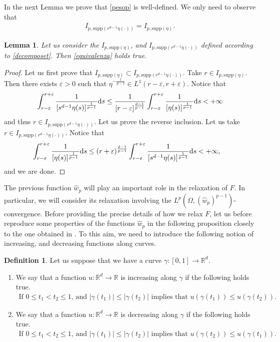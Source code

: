 \documentclass[11pt,leqno]{amsart}
\newtheorem{lem}[teo]{Lemma}
\theoremstyle{remark}
\theoremstyle{definition}
\newtheorem{defi}[teo]{Definition}%
\theoremstyle{definition}
\newcommand{\wstar}{{\hat w}}
\newcommand{\supp}{\mathrm{supp}}
\newcommand{\bbR}{{\mathbb{R}}}
\newcommand{\R}{\bbR}
\def\de{{\rm d}}
\begin{document}
In the next Lemma we prove that \eqref{pesop} is well-defined. We only need to observe that
\begin{align}
\label{equivalenza}
I_{p,\supp(r^{d-1}\eta(\cdot))}=I_{p,\supp(\eta)}.
\end{align}
\begin{lem}
Let us consider the $I_{p,\supp(\eta)}$, and $I_{p,\supp(r^{d-1}\eta(\cdot))}$ defined according to \eqref{decomposet}. Then \eqref{equivalenza} holds true.
\end{lem}
\begin{proof}
Let us first prove that $I_{p,\supp(\eta)}\subset I_{p,\supp(r^{d-1}\eta(\cdot))}$. Take $r\in I_{p,\supp(\eta)}$. Then there exists $\varepsilon>0$ such that $\eta^{-\frac{1}{p-1}}\in L^{1}(r-\varepsilon,r+\varepsilon)$. Notice that
\begin{align*}
\displaystyle\int_{r-\varepsilon}^{r+\varepsilon}\frac{1}{[s^{d-1}\eta(s)]^{\frac{1}{p-1}}}\de s\leq \frac{1}{[r-\varepsilon]^{\frac{d-1}{p-1}}}\displaystyle\int_{r-\varepsilon}^{r+\varepsilon}\frac{1}{[\eta(s)]^{\frac{1}{p-1}}}\de s<+\infty
\end{align*}
and thus $r\in I_{p,\supp(r^{d-1}\eta(\cdot))}$. Let us prove the reverse inclusion. Let us take $r\in I_{p,\supp(r^{d-1}\eta(\cdot))}$. Notice that
\begin{align*}
\displaystyle\int_{r-\varepsilon}^{r+\varepsilon}\frac{1}{[\eta(s)]^{\frac{1}{p-1}}}\de s&\leq (r+\varepsilon)^{\frac{d-1}{p-1}}\displaystyle\int_{r-\varepsilon}^{r+\varepsilon}\frac{1}{[s^{d-1}\eta(s)]^{\frac{1}{p-1}}}\de s<+\infty,
\end{align*}
and we are done.
\end{proof}
The previous function $\hat{w}_{p}$ will play an important role in the relaxation of $F$. In particular, we will consider its relaxation involving the $L^{p}(\Omega, (\hat{w}_{p})^{p-1})$-convergence. Before providing the precise details of how we relax $F$, let us before reproduce  some properties of the functions $\wstar_{p}$ in the following proposition closely to the one obtained in \cite[Proposition 2.5]{CCMH1}.  To this aim, we need to introduce the following notion of increasing, and decreasing functions along curves.
\begin{defi}
Let us suppose that we have a curve $\gamma:[0,1]\rightarrow \R^{d}$.
\begin{enumerate}
\item[I.]We say that a function $u:\R^{d}\rightarrow \R$ is increasing along $\gamma$ if the following holds true.
\begin{align}
\text{If $0\leq t_{1}<t_{2}\leq 1$, and $\vert \gamma(t_{1})\vert \leq \vert \gamma(t_{2})\vert$ implies that $u(\gamma(t_{1}))\leq u(\gamma(t_{2}))$.}
\end{align}
\item[II.] We say that a function $u:\R^{d}\rightarrow \R$ is decreasing along $\gamma$ if the following holds true.
\begin{align}
\text{If $0\leq t_{1}<t_{2}\leq 1$, and $\vert \gamma(t_{1})\vert \leq \vert \gamma(t_{2})\vert$ implies that $u(\gamma(t_{2}))\leq u(\gamma(t_{1}))$.}
\end{align}
\end{enumerate}
\end{defi}
\end{document}
